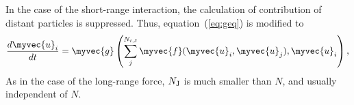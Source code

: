 In the case of the short-range interaction, the calculation of
contribution of distant particles is suppressed. Thus,
equation~(\ref{eq:geq}) is modified to
\begin{align}
  \frac{d\myvec{u}_i}{dt} = \myvec{g}\left(\sum_j^{N_{i,\rm J}}
    \myvec{f}(\myvec{u}_i,\myvec{u}_j), 
    \myvec{u}_i \right), \label{eq:geqS}
\end{align}
As in the case of the long-range force, $N_{\rm J}$ is much smaller 
than $N$, and usually independent of $N$. 


